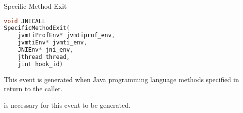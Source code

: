 \begin{apidef}{Specific Method Exit}
\begin{lstlisting}[language=C]
void JNICALL
SpecificMethodExit(
    jvmtiProfEnv* jvmtiprof_env,
    jvmtiEnv* jvmti_env,
    JNIEnv* jni_env,
    jthread thread,
    jint hook_id)
\end{lstlisting}

\begin{apidesc}
This event is generated when Java programming language methods specified in  return to the caller.
\end{apidesc}

\begin{apiphase}
\eventphaselive
\end{apiphase}

\begin{eventtype}
\end{eventtype}

\begin{apicap}
 is necessary for this event to be generated.
\end{apicap}

\begin{apiparam}
\end{apiparam}
\end{apidef}

